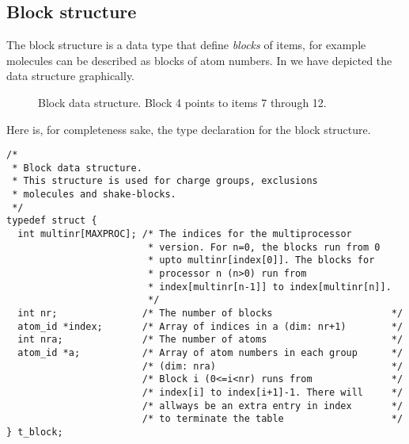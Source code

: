 \subsection{Block structure}
The block structure is a data type that define {\em blocks} of items,
for example molecules can be described as blocks of atom numbers.
In  we have depicted the data structure graphically.
\begin{figure}
\centerline{}
\caption[Block data structure.]{Block data structure. Block 4 points
to items 7 through 12.}
\label{fig:block}
\end{figure}

Here is, for completeness sake,
the type declaration for the block structure.
\begin{verbatim}
/*
 * Block data structure.
 * This structure is used for charge groups, exclusions
 * molecules and shake-blocks.
 */
typedef struct {
  int multinr[MAXPROC]; /* The indices for the multiprocessor 
                         * version. For n=0, the blocks run from 0
                         * upto multinr[index[0]]. The blocks for 
                         * processor n (n>0) run from 
                         * index[multinr[n-1]] to index[multinr[n]].
                         */
  int nr;               /* The number of blocks                     */
  atom_id *index;       /* Array of indices in a (dim: nr+1)        */
  int nra;              /* The number of atoms                      */
  atom_id *a;           /* Array of atom numbers in each group      */
                        /* (dim: nra)                               */
                        /* Block i (0<=i<nr) runs from              */
                        /* index[i] to index[i+1]-1. There will     */
                        /* allways be an extra entry in index       */
                        /* to terminate the table                   */
} t_block;
\end{verbatim}



